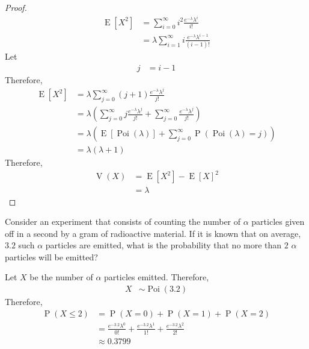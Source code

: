 \documentclass[titlepage, fleqn, a4paper, 12pt, twoside]{article}
\theoremstyle{definition}
\theoremstyle{theorem}
\DeclareMathOperator{\prob}{\mathrm{P}}
\DeclareMathOperator{\expct}{\mathrm{E}}
\DeclareMathOperator{\var}{\mathrm{V}}
\DeclareMathOperator{\poi}{\mathrm{Poi}}
\begin{document}
\begin{proof}
	\begin{align*}
		\expct\left[ X^2 \right] & = \sum\limits_{i = 0}^{\infty} i^2 \frac{e^{-\lambda} \lambda^i}{i!} \\
                                         & = \lambda \sum\limits_{i = 1}^{\infty} i \frac{e^{-\lambda} \lambda^{i - 1}}{(i - 1)!}
	\end{align*}
	Let
	\begin{align*}
		j & = i - 1
	\end{align*}
	Therefore,
	\begin{align*}
		\expct\left[ X^2 \right] & = \lambda \sum\limits_{j = 0}^{\infty} (j + 1) \frac{e^{-\lambda} \lambda^j}{j!}                                                                           \\
                                         & = \lambda \left( \sum\limits_{j = 0}^{\infty} j \frac{e^{-\lambda} \lambda^j}{j!} + \sum\limits_{j = 0}^{\infty} \frac{e^{-\lambda} \lambda^j}{j!} \right) \\
                                         & = \lambda \left( \expct\left[ \poi(\lambda) \right] + \sum\limits_{j = 0}^{\infty} \prob\left( \poi(\lambda) = j \right) \right)                           \\
                                         & = \lambda (\lambda + 1)
	\end{align*}
	Therefore,
	\begin{align*}
		\var(X) & = \expct\left[ X^2 \right] - \expct[X]^2 \\
                        & = \lambda
	\end{align*}
\end{proof}

\begin{question}
	Consider an experiment that consists of counting the number of $\alpha$ particles given off in a second by a gram of radioactive material.
	If it is known that on average, $3.2$ such $\alpha$ particles are emitted, what is the probability that no more than $2$ $\alpha$ particles will be emitted?
\end{question}

\begin{solution}
	Let $X$ be the number of $\alpha$ particles emitted.
	Therefore,
	\begin{align*}
		X & \sim \poi(3.2)
	\end{align*}
	Therefore,
	\begin{align*}
		\prob(X \le 2) & = \prob(X = 0) + \prob(X = 1) + \prob(X = 2)                                                    \\
                               & = \frac{e^{-3.2} \lambda^0}{0!} + \frac{e^{-3.2} \lambda^1}{1!} + \frac{e^{-3.2} \lambda^2}{2!} \\
                               & \approx 0.3799
	\end{align*}
\end{solution}
\end{document}
